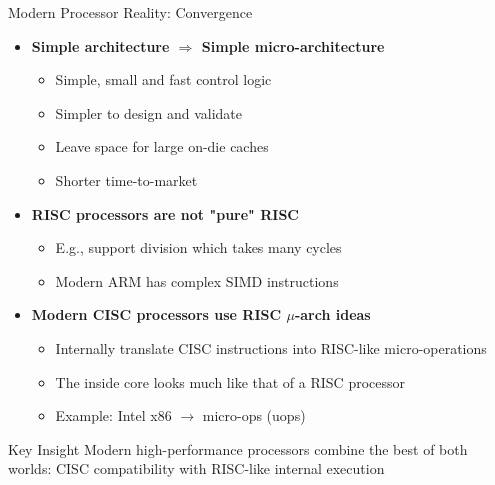 \documentclass[aspectratio=169,12pt]{beamer}
\begin{document}
\begin{frame}{Modern Processor Reality: Convergence}
\begin{itemize}
    \item \textbf{Simple architecture $\Rightarrow$ Simple micro-architecture}
    \begin{itemize}
        \item Simple, small and fast control logic
        \item Simpler to design and validate
        \item Leave space for large on-die caches
        \item Shorter time-to-market
    \end{itemize}
    \vspace{0.5cm}
    \item \textbf{RISC processors are not "pure" RISC}
    \begin{itemize}
        \item E.g., support division which takes many cycles
        \item Modern ARM has complex SIMD instructions
    \end{itemize}
    \vspace{0.5cm}
    \item \textbf{Modern CISC processors use RISC $\mu$-arch ideas}
    \begin{itemize}
        \item Internally translate CISC instructions into RISC-like micro-operations
        \item The inside core looks much like that of a RISC processor
        \item Example: Intel x86 $\rightarrow$ micro-ops (uops)
    \end{itemize}
\end{itemize}

\vspace{0.3cm}
\begin{alertblock}{Key Insight}
Modern high-performance processors combine the best of both worlds: CISC compatibility with RISC-like internal execution
\end{alertblock}
\end{frame}
\end{document}
